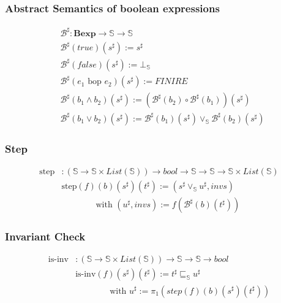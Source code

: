 \documentclass{beamer}
\begin{document}
\begin{frame}
    \frametitle{Abstract Semantics of boolean expressions}
    \begin{align*} 
    & \mathcal{B}^{\sharp}: \mathbf{B e x p} \rightarrow \mathbb{S} \rightarrow \mathbb{S} \\
    & \mathcal{B}^{\sharp} (true) (s^{\sharp}) := s^{\sharp} \\
    & \mathcal{B}^{\sharp} (false) (s^{\sharp}) := \bot_\mathbb{S} \\
    & \mathcal{B}^{\sharp} ( e_1 \text{ bop } e_2 ) (s^{\sharp}) := FINIRE \\
    & \mathcal{B}^{\sharp} ( b_1 \land b_2 ) (s^{\sharp}) := (\mathcal{B}^{\sharp} ( b_2 ) \circ \mathcal{B}^{\sharp} ( b_1 )) (s^{\sharp}) \\
    & \mathcal{B}^{\sharp} ( b_1 \lor b_2 ) (s^{\sharp}) := \mathcal{B}^{\sharp} ( b_1) (s^{\sharp}) \vee_\mathbb{S} \mathcal{B}^{\sharp} ( b_2) (s^{\sharp})
\end{align*}
\end{frame}


\begin{frame}
    \frametitle{Step}
    \begin{align*}
        \text{step} &: (\mathbb{S} \to \mathbb{S} \times List(\mathbb{S})) \to bool \to \mathbb{S} \to \mathbb{S} \to \mathbb{S} \times List(\mathbb{S}) \\
        &\text{step} (f) (b) (s^{\sharp}) (t^{\sharp}) := (s^{\sharp} \vee_\mathbb{S} u^{\sharp}, invs)\\
        & \qquad \qquad \text{with } (u^{\sharp}, invs) := f (\mathcal{B}^{\sharp} (b) (t^{\sharp}))
    \end{align*}
\end{frame}

\begin{frame}
    \frametitle{Invariant Check}
    \begin{align*}
        \text{is-inv} &: (\mathbb{S} \to \mathbb{S} \times List(\mathbb{S}))  \to \mathbb{S} \to \mathbb{S} \to bool \\
        & \text{is-inv} (f) (s^{\sharp}) (t^{\sharp}) := t^{\sharp} \sqsubseteq_\mathbb{S} u^{\sharp} \\
        & \qquad \qquad \text{with } u^{\sharp} := \pi_1 (step (f) (b) (s^{\sharp}) (t^{\sharp}))
    \end{align*}
\end{frame}
\end{document}
